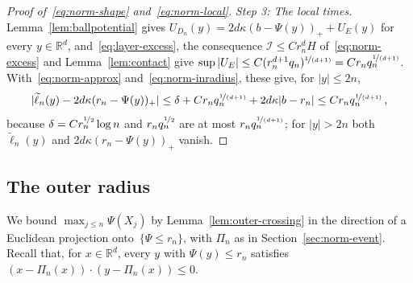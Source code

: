 \documentclass[11pt]{amsart}
\theoremstyle{plain}
\theoremstyle{definition}
\newcommand{\R}{\mathbb R}
\newcommand{\drift}{\kappa}
\newcommand{\gauge}{\Psi}
\newcommand{\nf}{\nicefrac}
\numberwithin{equation}{section}
\begin{document}
\begin{proof}[Proof of~\eqref{eq:norm-shape} and~\eqref{eq:norm-local}]
\emph{Step 3: The local times.} Lemma~\ref{lem:ballpotential} gives $U_{D_n}(y)=2d\drift(b-\gauge(y))_++U_E(y)$ for every $y\in\R^d$, and~\eqref{eq:layer-excess}, the consequence $\mathcal I\leq Cr_n^dH$ of~\eqref{eq:norm-excess} and Lemma~\ref{lem:contact} give $\sup|U_E|\leq C(r_n^{d+1}q_n)^{\nf{1}{(d+1)}}=Cr_nq_n^{\nf{1}{(d+1)}}$. With~\eqref{eq:norm-approx} and~\eqref{eq:norm-inradius}, these give, for $|y|\leq2n$,
\begin{equation}\label{eq:norm-profile}
|\widetilde\ell_n(y)-2d\drift(r_n-\gauge(y))_+|
\leq\delta+Cr_nq_n^{\nf{1}{(d+1)}}+2d\drift|b-r_n|
\leq Cr_nq_n^{\nf{1}{(d+1)}}\, ,
\end{equation}
because $\delta=Cr_n^{\nf12}\log n$ and $r_nq_n^{\nf12}$ are at most $r_nq_n^{\nf{1}{(d+1)}}$; for $|y|>2n$ both $\widetilde\ell_n(y)$ and $2d\drift(r_n-\gauge(y))_+$ vanish.
\end{proof}

\subsection{The outer radius}\label{sec:norm-outer}

We bound $\max_{j\leq n}\gauge(X_j)$ by Lemma~\ref{lem:outer-crossing} in the direction of a Euclidean projection onto~$\{\gauge\leq r_n\}$, with $\Pi_n$ as in Section~\ref{sec:norm-event}. Recall that, for $x\in\R^d$, every $y$ with $\gauge(y)\leq r_n$ satisfies $(x-\Pi_n(x))\cdot(y-\Pi_n(x))\leq0$.
\end{document}
